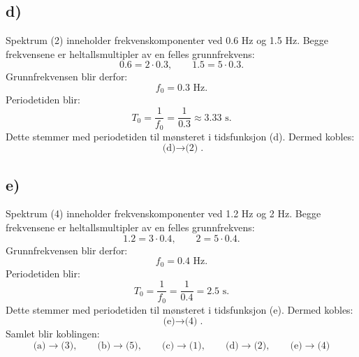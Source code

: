 \subsection*{d)}
Spektrum (2) inneholder frekvenskomponenter ved 0.6 Hz og 1.5 Hz.
Begge frekvensene er heltallsmultipler av en felles grunnfrekvens:
\[
0.6=2\cdot0.3,\qquad1.5=5\cdot0.3.
\]
Grunnfrekvensen blir derfor:
\[
f_0=0.3\text{ Hz}.
\]
Periodetiden blir:
\[
T_0=\frac{1}{f_0}
=\frac{1}{0.3}
\approx3.33\text{ s}.
\]
Dette stemmer med periodetiden til mønsteret i tidsfunksjon (d).
Dermed kobles:
\[
\boxed{\text{(d)}\rightarrow\text{(2)}}.
\]
\subsection*{e)}
Spektrum (4) inneholder frekvenskomponenter ved 1.2 Hz og 2 Hz.
Begge frekvensene er heltallsmultipler av en felles grunnfrekvens:
\[
1.2=3\cdot0.4,\qquad2=5\cdot0.4.
\]
Grunnfrekvensen blir derfor:
\[
f_0=0.4\text{ Hz}.
\]
Periodetiden blir:
\[
T_0=\frac{1}{f_0}
=\frac{1}{0.4}
=2.5\text{ s}.
\]
Dette stemmer med periodetiden til mønsteret i tidsfunksjon (e).
Dermed kobles:
\[
\boxed{\text{(e)}\rightarrow\text{(4)}}.
\]
Samlet blir koblingen:
\[
\boxed{
\text{(a)}\rightarrow\text{(3)},\qquad
\text{(b)}\rightarrow\text{(5)},\qquad
\text{(c)}\rightarrow\text{(1)},\qquad
\text{(d)}\rightarrow\text{(2)},\qquad
\text{(e)}\rightarrow\text{(4)}
}
\]